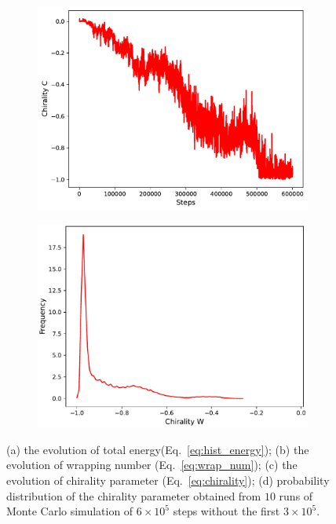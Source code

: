 \documentclass[a4paper,10pt]{article}
\begin{document}
\begin{figure}[tb]
\begin{subfigure}{.33\textwidth}
\includegraphics[width=\textwidth]{hist_chirality.pdf}
\caption{}
\label{fig:hist_ch}
\end{subfigure}
\begin{subfigure}{.33\textwidth}
\includegraphics[width=\textwidth]{hist_ch_pr.pdf}
\caption{}
\label{fig:hist_ch_pr}
\end{subfigure}
\caption{(a) the evolution of total energy(Eq.~\ref{eq:hist_energy});
(b) the evolution of wrapping number (Eq.~\ref{eq:wrap_num});
(c) the evolution of chirality parameter (Eq.~\ref{eq:chirality});
(d) probability distribution of the chirality parameter obtained from $10$ runs of Monte Carlo simulation of $6\times 10^5$ steps without the first $3\times 10^5$.}
\label{fig:hist_params}
\end{figure}
\end{document}
